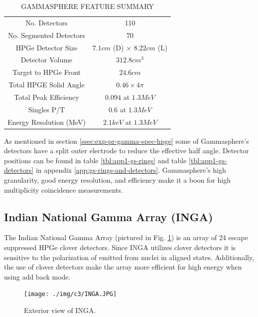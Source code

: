 \begin{table}[h]
\caption{GAMMASPHERE FEATURE SUMMARY\label{tbl:gs-summary}}
\begin{center}
\begin{tabular}{|c|c|}
\hline
\hline No. Detectors             & 110 \\ 
No. Segmented Detectors   & 70 \\ 
HPGe Detector Size        & $7.1 cm$ (D) $\times$ $8.22 cm$ (L) \\
Detector Volume           & $312.8 cm^3$\\
Target to HPGe Front      & $24.6 cm$\\ 
Total HPGE Solid Angle    & $0.46 \times 4\pi$\\ 
Total Peak Efficiency     & $0.094$ at $1.3 MeV$\\ 
Singles P/T               & $0.6$ at $1.3 MeV$ \\ 
Energy Resolution (MeV)   & $2.1keV$ at $1.3 MeV$ \\ 
\hline 
\hline 
\end{tabular}
\end{center}
\end{table}

As mentioned in section \ref{ssec:exp-pr-gamma-spec-hpge} some of Gammasphere's detectors have a split outer electrode to reduce the effective half angle. Detector positions can be found in table \ref{tbl:app1-gs-rings} and table \ref{tbl:app1-gs-detectors} in appendix \ref{app:gs-rings-and-detectors}. Gammasphere's high granularity, good energy resolution, and efficiency make it a boon for high \gr{} multiplicity coincidence measurements.

\subsection{Indian National Gamma Array (INGA)}
\label{ssec:exp-pr-gamma-spec-inga}
The Indian National Gamma Array (pictured in Fig. \ref{fig:chp3-INGA}) is an array of 24 escape suppressed HPGe clover detectors\cite{ingaAtIUAC}. Since INGA utilizes clover detectors it is sensitive to the polarization of \gr{} emitted from nuclei in aligned states\cite{cloverDet}. Additionally, the use of clover detectors make the array more efficient for high energy \gr{} when using add back mode.

\begin{figure}[h!]
	\centerline{\texttt{[image: ./img/c3/INGA.JPG]}}
	\caption{Exterior view of INGA.}
	\label{fig:chp3-INGA}
\end{figure}

